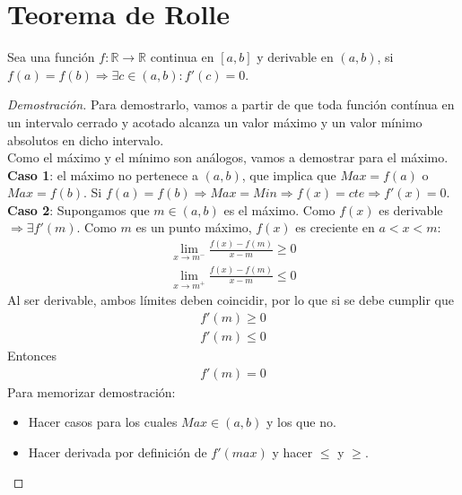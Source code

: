\documentclass{article}
\begin{document}
\section{Teorema de Rolle}
    Sea una función $f: \mathbb{R} \to \mathbb{R}$ continua en $[a,b]$ y derivable en $(a,b)$, si
    $f(a)=f(b)\Rightarrow \exists c \in (a,b): f'(c)=0$.
\begin{proof}[Demostración]
    Para demostrarlo, vamos a partir de que toda función contínua en un intervalo cerrado y acotado
    alcanza un valor máximo y un valor mínimo absolutos en dicho intervalo.\\
    Como el máximo y el mínimo son análogos, vamos a demostrar para el máximo.\\
    \textbf{Caso 1}: el máximo no pertenece a $(a,b)$, que implica que $Max=f(a)$ o $Max=f(b)$. Si
    $f(a)=f(b)\Rightarrow Max=Min \Rightarrow f(x)=cte\Rightarrow f'(x)=0$.
    \textbf{Caso 2}: Supongamos que $m\in (a,b)$ es el máximo. Como $f(x)$ es derivable $\Rightarrow \exists f'(m)$.
    Como $m$ es un punto máximo, $f(x)$ es creciente en $a<x<m$:
    \begin{equation}
        \begin{split}
            \lim_{x \to m^-} \frac{f(x)-f(m)}{x-m}\geq 0\\
            \lim_{x \to m^+} \frac{f(x)-f(m)}{x-m}\leq 0
        \end{split}
    \end{equation}
    Al ser derivable, ambos límites deben coincidir, por lo que si se debe cumplir que
    \begin{equation}
        \begin{split}
            f'(m)\geq 0\\
            f'(m)\leq 0
        \end{split}
    \end{equation}
    Entonces
    \begin{equation}
        \begin{split}
            f'(m)=0
        \end{split}
    \end{equation}
Para memorizar demostración:
\begin{itemize}
	\item Hacer casos para los cuales \(Max \in (a,b)\) y los que no.
	\item Hacer derivada por definición de \(f'(max)\) y hacer \(\leq\) y \(\geq\).  
\end{itemize}
\end{proof}
\end{document}
